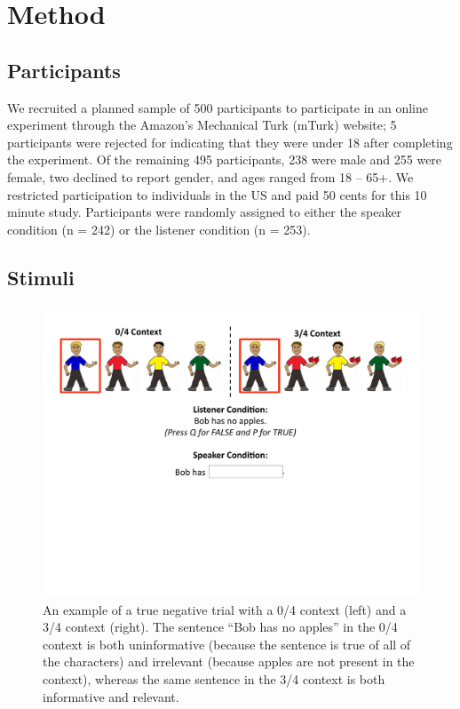 \documentclass[man, noapacite]{apa2}
\begin{document}
\section{Method}

\subsection{Participants}

We recruited a planned sample of 500 participants to participate in an online experiment through the Amazon's Mechanical Turk (mTurk) website; 5 participants were rejected for indicating that they were under 18 after completing the experiment.  Of the remaining 495 participants, 238 were male and 255 were female, two declined to report gender, and ages ranged from 18 -- 65+.  We restricted participation to individuals in the US and paid 50 cents for this 10 minute study.  Participants were randomly assigned to either the speaker condition (n = 242) or the listener condition (n = 253).

\subsection{Stimuli}

\begin{figure}[t]
\begin{center}
\includegraphics[width=6in]{figures/trialfig.pdf}
\caption{\label{fig:trial} An example of a true negative trial with a 0/4 context (left) and a 3/4 context (right).  The sentence ``Bob has no apples'' in the 0/4 context is both uninformative (because the sentence is true of all of the characters) and irrelevant (because apples are not present in the context), whereas the same sentence in the 3/4 context is both informative and relevant. }
\vspace{-5mm}
\end{center}
\end{figure}
\end{document}
